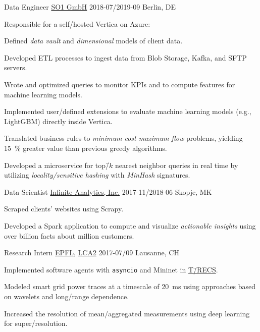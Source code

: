 \documentclass[%
version=last,%
fontsize=11pt,%
paper=A4,%
headinclude=false,%
footinclude=false,%
headlines=0,%
footlines=0,%
areasetadvanced,%
toc=bibnumbered,%
]{scrartcl}%
\begin{document}
\begin{minipage}[t]{0.575\textwidth}
  \WorkEntry%
  {Data Engineer}%
  {\href{https://www.so1.ai/en/}{SO1 GmbH}}%
  {2018-07/2019-09}%
  {Berlin, DE}%
  {%
    \begin{citemize}
    \item Responsible for a self\-/hosted Vertica on Azure:
      \begin{citemize}
      \item Defined \emph{data vault} and \emph{dimensional} models of client
        data.
      \item Developed ETL processes to ingest data from Blob Storage, Kafka, and
        SFTP servers.
      \item Wrote and optimized queries to monitor KPIs and to compute features
        for machine learning models.
      \item Implemented user\-/defined extensions to evaluate machine learning
        models (e.g., LightGBM) directly inside Vertica.
      \end{citemize}
    \item Translated business rules to \emph{minimum cost maximum flow}
      problems, yielding \SI{15}{\percent} greater value than previous greedy
      algorithms.
    \item Developed a microservice for top\=/\(k\) nearest neighbor queries in
      real time by utilizing \emph{locality\-/sensitive hashing} with
      \emph{MinHash} signatures.
    \end{citemize}%
  }

  \WorkEntry%
  {Data Scientist}%
  {\href{http://infiniteanalytics.com/}{Infinite Analytics, Inc.}}%
  {2017-11/2018-06}%
  {Skopje, MK}%
  {%
    \begin{citemize}
    \item Scraped clients’ websites using Scrapy.
    \item Developed a Spark application to compute and visualize
      \emph{actionable insights} using over  billion facts about
       million customers.
    \end{citemize}%
  }

  \WorkEntry%
  {Research Intern}%
  {\href{https://epfl.ch/}{EPFL}, \href{http://lca.epfl.ch/}{LCA2}}%
  {2017-07/09}%
  {Lausanne, CH}%
  {%
    \begin{citemize}
    \item Implemented software agents with \texttt{asyncio} and
      Mininet in
      \href{https://www.epfl.ch/labs/desl-pwrs/smartgrid/t-recs/}{T\=/RECS}.
    \item Modeled smart grid power traces at a timescale of \SI{20}{\ms} using
      approaches based on wavelets and long\-/range dependence.
    \item Increased the resolution of mean\-/aggregated measurements using deep
      learning for super\-/resolution.
    \end{citemize}%
  }


\end{minipage}
\end{document}
